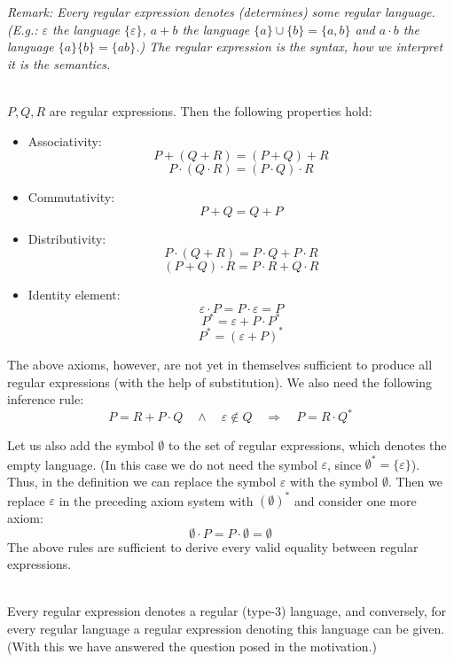\documentclass[margin=0px]{article}
\begin{document}
\begin{description}
        \textit{Remark: Every regular expression denotes (determines) some regular language. (E.g.: $\varepsilon$ the language $\{\varepsilon\}$, $a+b$ the language $\{a\} \cup \{b\} = \{a,b\}$ and $a\cdot b$ the language $\{a\}\{b\} = \{ab\}$.) The regular expression is the syntax, how we interpret it is the semantics.}
        \item[Axioms]\hfill \\
        $P,Q,R$ are regular expressions. Then the following properties hold:
        \begin{itemize}
            \item Associativity:
                  \[P+(Q+R) = (P+Q)+R\]
                  \[P\cdot(Q\cdot R) = (P\cdot Q)\cdot R\]
            \item Commutativity:
                  \[P+Q = Q+P\]
            \item Distributivity:
                  \[P\cdot (Q+R) = P\cdot Q + P\cdot R\]
                  \[(P+Q)\cdot R = P\cdot R + Q\cdot R\]
            \item Identity element:
                  \[\varepsilon\cdot P = P\cdot\varepsilon = P\]
                  \[P^* = \varepsilon + P \cdot P^*\]
                  \[P^* = (\varepsilon+P)^*\]
        \end{itemize}

        The above axioms, however, are not yet in themselves sufficient to produce all regular expressions (with the help of substitution). We also need the following inference rule:
        \[P=R+P\cdot Q \quad \land \quad \varepsilon \notin Q \quad \Longrightarrow \quad P = R\cdot Q^*\]

        Let us also add the symbol $\emptyset$ to the set of regular expressions, which denotes the empty language. (In this case we do not need the symbol $\varepsilon$, since $\emptyset^* = \{\varepsilon\}$). Thus, in the definition we can replace the symbol $\varepsilon$ with the symbol $\emptyset$. Then we replace $\varepsilon$ in the preceding axiom system with $(\emptyset)^*$ and consider one more
        axiom:
        \[\emptyset\cdot P = P\cdot\emptyset = \emptyset\]
        The above rules are sufficient to derive every valid equality between regular expressions.
    \item[Regular expressions and regular languages] \hfill \\
        Every regular expression denotes a regular (type-3) language, and conversely, for every regular language a regular expression denoting this language can be given.\\ (With this we have answered the question posed in the motivation.)
\end{description}
\end{document}

